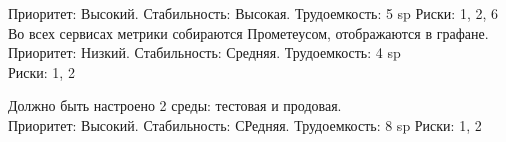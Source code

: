 Приоритет: Высокий. Стабильность: Высокая. Трудоемкость: 5 sp
Риски: 1, 2, 6\\

Во всех сервисах метрики собираются Прометеусом,
отображаются в графане.\\

Приоритет: Низкий. Стабильность: Средняя. Трудоемкость: 4 sp\\
Риски: 1, 2

Должно быть настроено 2 среды: тестовая и продовая.\\

Приоритет: Высокий. Стабильность: СРедняя. Трудоемкость: 8 sp
Риски: 1, 2\\
